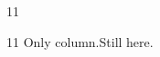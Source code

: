\documentclass[paper=A4]{ropas-poster}
\begin{document}
\begin{postergrid}{1}{1}
\begin{posterblock}{1}{1}
Only column.\columnbreak Still here.
\end{posterblock}
\end{postergrid}
\end{document}
